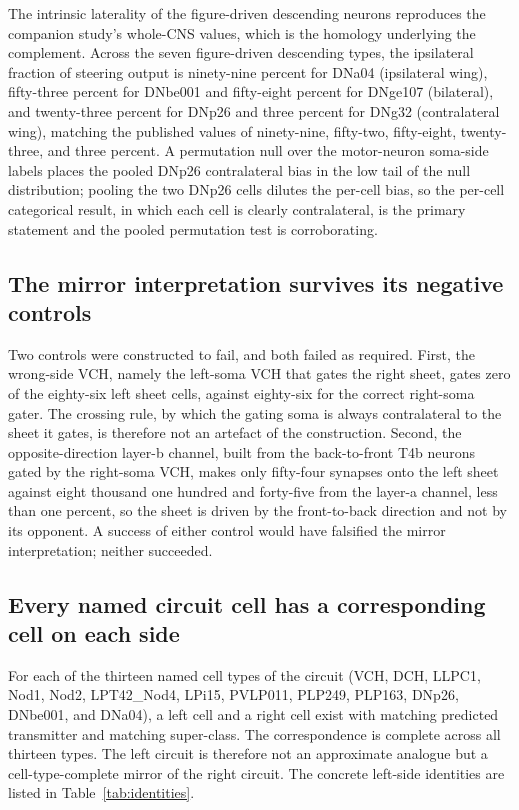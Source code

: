 \documentclass[11pt]{article}
\begin{document}
The intrinsic laterality of the figure-driven descending neurons reproduces the companion study's
whole-CNS values, which is the homology underlying the complement. Across the seven figure-driven
descending types, the ipsilateral fraction of steering output is ninety-nine percent for DNa04
(ipsilateral wing), fifty-three percent for DNbe001 and fifty-eight percent for DNge107
(bilateral), and twenty-three percent for DNp26 and three percent for DNg32 (contralateral wing),
matching the published values of ninety-nine, fifty-two, fifty-eight, twenty-three, and three
percent. A permutation null over the motor-neuron soma-side labels places the pooled DNp26
contralateral bias in the low tail of the null distribution; pooling the two DNp26 cells dilutes
the per-cell bias, so the per-cell categorical result, in which each cell is clearly
contralateral, is the primary statement and the pooled permutation test is corroborating.

\subsection{The mirror interpretation survives its negative controls}

Two controls were constructed to fail, and both failed as required. First, the wrong-side VCH,
namely the left-soma VCH that gates the right sheet, gates zero of the eighty-six left sheet
cells, against eighty-six for the correct right-soma gater. The crossing rule, by which the
gating soma is always contralateral to the sheet it gates, is therefore not an artefact of the
construction. Second, the opposite-direction layer-b channel, built from the back-to-front T4b
neurons gated by the right-soma VCH, makes only fifty-four synapses onto the left sheet against
eight thousand one hundred and forty-five from the layer-a channel, less than one percent, so the
sheet is driven by the front-to-back direction and not by its opponent. A success of either
control would have falsified the mirror interpretation; neither succeeded.

\subsection{Every named circuit cell has a corresponding cell on each side}

For each of the thirteen named cell types of the circuit (VCH, DCH, LLPC1, Nod1, Nod2,
LPT42\_Nod4, LPi15, PVLP011, PLP249, PLP163, DNp26, DNbe001, and DNa04), a left cell and a right
cell exist with matching predicted transmitter and matching super-class. The correspondence is
complete across all thirteen types. The left circuit is therefore not an approximate analogue but
a cell-type-complete mirror of the right circuit. The concrete left-side identities are listed in
Table~\ref{tab:identities}.
\end{document}
